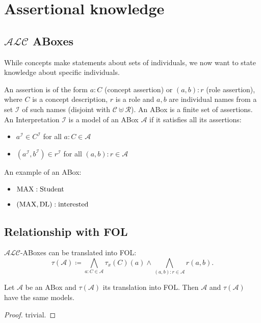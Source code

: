\section{Assertional knowledge}
\subsection{$\mathcal{ALC}$ ABoxes}
While concepts make statements about sets of individuals, we now want to state knowledge about specific individuals.

\begin{definition}
	An assertion is of the form $a:C$ (concept assertion) or $(a,b):r$ (role assertion),
	where $C$ is a concept description, $r$ is a role and $a,b$ are individual names from a set $\mathscr{I}$ of such names (disjoint with $\mathscr{C} \uplus \mathscr{R}$).
	An ABox is a finite set of assertions.
	An Interpretation $\mathcal{I}$ is a model of an ABox $\mathcal{A}$ if it satisfies all its assertions:
	\begin{itemize}
		\item $a^{\mathcal{I}} \in C^{\mathcal{I}}$ for all $a:C \in \mathcal{A}$ 
		\item $(a^{\mathcal{I}}, b^{\mathcal{I}}) \in r^{\mathcal{I}}$ for all $(a,b):r \in \mathcal{A}$
	\end{itemize}
\end{definition}

\begin{example}
	An example of an ABox:
	\begin{itemize}
		\item $ \mathit{\text{MAX}}: \mathit{\text{Student}}$
		\item $(\mathit{\text{MAX}}, \mathit{\text{DL}}): \mathit{\text{interested}}$
	\end{itemize}
\end{example}

\subsection{Relationship with FOL}
$\mathcal{ALC}$-ABoxes can be translated into FOL:
\[
	\tau(\mathcal{A}) \coloneqq \bigwedge_{a:C \in \mathcal{A}} \tau_{x}(C)(a) \land \bigwedge_{(a,b):r \in \mathcal{A}} r(a,b)
.\]

\begin{lemma}
	Let $\mathcal{A}$ be an ABox and $\tau(\mathcal{A})$ its translation into FOL.
	Then $\mathcal{A}$ and $\tau (\mathcal{A})$ have the same models.
\end{lemma}
\begin{proof}
	trivial.
\end{proof}

